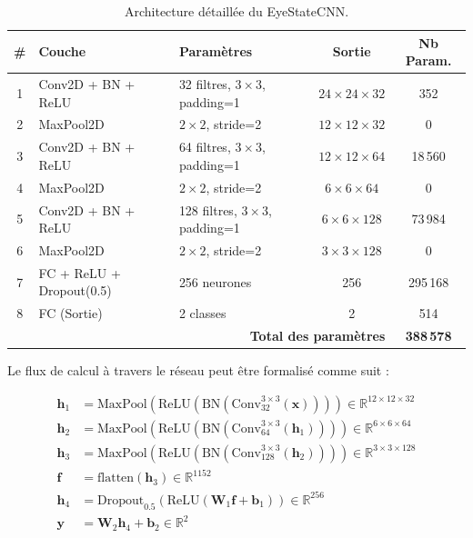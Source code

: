\documentclass[12pt,a4paper,twoside]{report}
\begin{document}
\begin{table}[H]
\centering
\caption{Architecture détaillée du EyeStateCNN.}
\label{tab:eye_cnn}
\renewcommand{\arraystretch}{1.3}
\begin{tabularx}{\textwidth}{|c|l|l|c|c|}
\hline
\rowcolor{stellantisblue!15}
\textbf{\#} & \textbf{Couche} & \textbf{Paramètres} & \textbf{Sortie} & \textbf{Nb Param.} \\
\hline
1 & Conv2D + BN + ReLU & 32 filtres, $3 \times 3$, padding=1 & $24 \times 24 \times 32$ & 352 \\
\hline
2 & MaxPool2D & $2 \times 2$, stride=2 & $12 \times 12 \times 32$ & 0 \\
\hline
3 & Conv2D + BN + ReLU & 64 filtres, $3 \times 3$, padding=1 & $12 \times 12 \times 64$ & 18\,560 \\
\hline
4 & MaxPool2D & $2 \times 2$, stride=2 & $6 \times 6 \times 64$ & 0 \\
\hline
5 & Conv2D + BN + ReLU & 128 filtres, $3 \times 3$, padding=1 & $6 \times 6 \times 128$ & 73\,984 \\
\hline
6 & MaxPool2D & $2 \times 2$, stride=2 & $3 \times 3 \times 128$ & 0 \\
\hline
7 & FC + ReLU + Dropout(0.5) & 256 neurones & 256 & 295\,168 \\
\hline
8 & FC (Sortie) & 2 classes & 2 & 514 \\
\hline
\multicolumn{4}{|r|}{\textbf{Total des paramètres}} & \textbf{388\,578} \\
\hline
\end{tabularx}
\end{table}

Le flux de calcul à travers le réseau peut être formalisé comme suit :

\begin{align}
\mathbf{h}_1 &= \text{MaxPool}\left(\text{ReLU}\left(\text{BN}\left(\text{Conv}_{32}^{3\times3}(\mathbf{x})\right)\right)\right) \in \mathbb{R}^{12 \times 12 \times 32} \label{eq:layer1} \\
\mathbf{h}_2 &= \text{MaxPool}\left(\text{ReLU}\left(\text{BN}\left(\text{Conv}_{64}^{3\times3}(\mathbf{h}_1)\right)\right)\right) \in \mathbb{R}^{6 \times 6 \times 64} \label{eq:layer2} \\
\mathbf{h}_3 &= \text{MaxPool}\left(\text{ReLU}\left(\text{BN}\left(\text{Conv}_{128}^{3\times3}(\mathbf{h}_2)\right)\right)\right) \in \mathbb{R}^{3 \times 3 \times 128} \label{eq:layer3} \\
\mathbf{f} &= \text{flatten}(\mathbf{h}_3) \in \mathbb{R}^{1152} \label{eq:flatten} \\
\mathbf{h}_4 &= \text{Dropout}_{0.5}\left(\text{ReLU}\left(\mathbf{W}_1 \mathbf{f} + \mathbf{b}_1\right)\right) \in \mathbb{R}^{256} \label{eq:fc1} \\
\mathbf{y} &= \mathbf{W}_2 \mathbf{h}_4 + \mathbf{b}_2 \in \mathbb{R}^{2} \label{eq:fc2}
\end{align}
\end{document}
